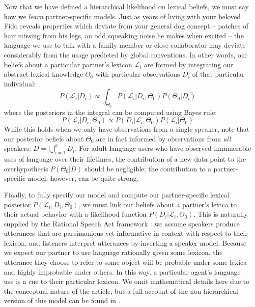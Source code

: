 Now that we have defined a hierarchical likelihood on lexical beliefs, we must say how we \emph{learn} partner-specific models. Just as years of living with your beloved Fido reveals properties which deviate from your general dog concept -- patches of hair missing from his legs, an odd squeaking noise he makes when excited -- the language we use to talk with a family member or close collaborator may deviate considerably from the usage predicted by global conventions. In other words, our beliefs about a particular partner's lexicon $\mathcal{L}_i$ are formed by integrating our abstract lexical knowledge $\Theta_0$ with particular  observations $D_i$ of that particular individual:
$$%
P(\mathcal{L}_i | D_i)  \propto \int_{\Theta_0}P(\mathcal{L}_i | D_i,  \Theta_0) P(\Theta_0 | D_i) 
$$
where the posteriors in the integral can be computed using Bayes rule:
$$
P(\mathcal{L}_i | D_i, \Theta_0) \propto P(D_i | \mathcal{L}_i, \Theta_0) P(\mathcal{L}_i | \Theta_0)
$$
While this holds when we only have observations from a single speaker, note that our posterior beliefs about $\Theta_0$ are in fact informed by observations from \emph{all} speakers: $D = \bigcup_{i=1}^k D_i$. For  adult language users who have observed innumerable uses of language over their lifetimes, the contribution of a new data point to the overhypothesis $P(\Theta_0 | D)$ should be negligible; the contribution to a partner-specific model, however, can be quite strong. 

Finally, to fully specify our model and compute our partner-specific lexical posterior $P(\mathcal{L}_i, D_i, \Theta_0)$, we must link our beliefs about a partner's lexica to their actual behavior with a likelihood function $P(D_i | \mathcal{L}_i, \Theta_0)$. This is naturally supplied by the Rational Speech Act framework \cite{FrankGoodman12_PragmaticReasoningLanguageGames,GoodmanFrank16_RSATiCS,BergenLevyGoodman16_LexicalUncertainty,SmithGoodmanFrank13_RecursivePragmaticReasoningNIPS}: we assume speakers produce utterances that are parsimonious yet informative in context with respect to their lexicon, and listeners interpret utterances by inverting a speaker model. Because we expect our partner to use language rationally given some lexicon, the utterance they choose to refer to some object will be probable under some lexica and highly improbable under others. In this way, a particular agent's language use is a cue to their particular lexicon. We omit mathematical details here due to the conceptual nature of the article, but a full account of the non-hierarchical version of this model can be found in .

